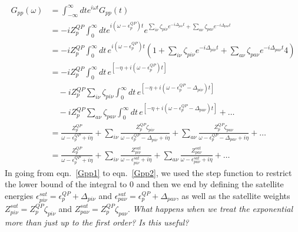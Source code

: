 \begin{align}
G_{pp}(\omega) & = \int_{-\infty}^{\infty} dt e^{i \omega t} G_{pp}(t)
\label{Gpp1}
\\
& = -i Z_p^{QP} \int_0^{\infty} dt e^{i(\omega - \epsilon_p^{QP}) t} e^{\sum_{i\nu} \zeta_{pi\nu} e^{-i\Delta_{pi\nu} t} + \sum_{a\nu} \zeta_{pa\nu} e^{-i\Delta_{pa\nu} t}} 
\label{Gpp2}
\\
& = -i Z_p^{QP} \int_0^{\infty} dt\, e^{i(\omega - \epsilon_p^{QP}) t} \left(1 + \sum_{i\nu} \zeta_{pi\nu} e^{-i\Delta_{pi\nu} t} + \sum_{a\nu} \zeta_{pa\nu} e^{-i\Delta_{pa\nu} t}4 \right) \\
&= -i Z_p^{QP} \int_0^{\infty} dt\, e^{[-\eta + i(\omega - \epsilon_p^{QP}) t]}\label{Gpp3} \\
&\quad - i Z_p^{QP} \sum_{i\nu} \zeta_{pi\nu} \int_0^{\infty} dt\, e^{[-\eta + i(\omega - \epsilon_p^{QP} - \Delta_{pi\nu}) t]} \\
&\quad - i Z_p^{QP} \sum_{a\nu} \zeta_{pa\nu} \int_0^{\infty} dt\, e^{[-\eta + i(\omega - \epsilon_p^{QP} - \Delta_{pa\nu}) t]} + \ldots \\
&= \frac{Z_p^{QP}}{\omega - \epsilon_p^{QP} + i\eta} + \sum_{i\nu} \frac{Z_p^{QP} \zeta_{pi\nu}}{\omega - \epsilon_p^{QP} - \Delta_{pi\nu} + i\eta} + \sum_{a\nu} \frac{Z_p^{QP} \zeta_{pa\nu}}{\omega - \epsilon_p^{QP} - \Delta_{pa\nu} + i\eta} + \ldots\\
& = \frac{Z_p^{QP}}{\omega - \epsilon_p^{QP} + i\eta} + \sum_{i\nu} \frac{Z_{pi\nu}^{sat}}{\omega - \epsilon_{pi\nu}^{sat} + i\eta} + \sum_{a\nu} \frac{Z_{pa\nu}^{sat}}{\omega - \epsilon_{pa\nu}^{sat} + i\eta} + \ldots
\end{align}
In going from eqn.~\ref{Gpp1} to eqn.~\ref{Gpp2}, we used the step function to restrict the lower bound of the integral to $0$ and then we end by defining the satellite energies $\epsilon_{pi\nu}^{sat} = \epsilon_p^{QP} + \Delta_{pi\nu}$ and $\epsilon_{pa\nu}^{sat} = \epsilon_p^{QP} + \Delta_{pa\nu}$, as well as the satellite weights $Z_{pi\nu}^{sat} = Z_p^{QP} \zeta_{pi\nu}$ and $Z_{pa\nu}^{sat} = Z_p^{QP} \zeta_{pa\nu}$. \emph{What happens when we treat the exponential more than just up to the first order? Is this useful?}
